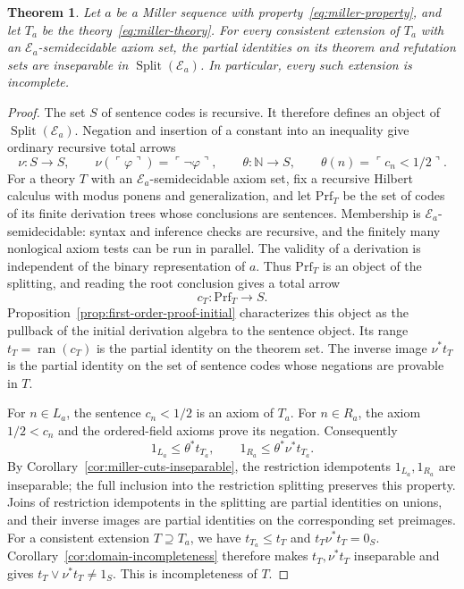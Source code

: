 \documentclass[11pt]{article}
\newtheorem{theorem}{Theorem}[section]
\newcommand{\N}{\mathbb N}
\newcommand{\ran}{\operatorname{ran}}
\begin{document}
\begin{theorem}\label{thm:miller-incompleteness}
Let $a$ be a Miller sequence with property~\eqref{eq:miller-property},
and let $T_a$ be the theory~\eqref{eq:miller-theory}.
For every consistent extension of $T_a$ with an
$\mathcal E_a$-semidecidable axiom set, the partial identities on its
theorem and refutation sets are inseparable in
$\operatorname{Split}(\mathcal E_a)$.
In particular, every such extension is incomplete.
\end{theorem}
\begin{proof}
The set $S$ of sentence codes is recursive. It therefore defines an
object of $\operatorname{Split}(\mathcal E_a)$. Negation and insertion
of a constant into an inequality give ordinary recursive total arrows
\[
 \nu:S\to S,\qquad
 \nu(\ulcorner\varphi\urcorner)=\ulcorner\neg\varphi\urcorner,
 \qquad
 \theta:\N\to S,\qquad
 \theta(n)=\ulcorner c_n<1/2\urcorner.
\]
For a theory $T$ with an $\mathcal E_a$-semidecidable axiom set,
fix a recursive Hilbert calculus with modus ponens and generalization,
and let $\mathrm{Prf}_T$ be the set of codes of its finite derivation
trees whose conclusions are sentences. Membership is
$\mathcal E_a$-semidecidable: syntax and inference checks are recursive,
and the finitely many nonlogical axiom tests can be run in parallel.
The validity of a derivation is independent of the binary representation of $a$. Thus
$\mathrm{Prf}_T$ is an object of the splitting, and reading the root
conclusion gives a total arrow
\[
 c_T:\mathrm{Prf}_T\to S.
\]
Proposition~\ref{prop:first-order-proof-initial} characterizes this object
as the pullback of the initial derivation algebra to the sentence object.
Its range $t_T=\ran(c_T)$ is the partial identity on the theorem set.
The inverse image $\nu^*t_T$ is the partial identity on the set of
sentence codes whose negations are provable in $T$.

For $n\in L_a$, the sentence $c_n<1/2$ is an axiom of $T_a$.
For $n\in R_a$, the axiom $1/2<c_n$ and the ordered-field axioms
prove its negation. Consequently
\[
 1_{L_a}\le\theta^*t_{T_a},\qquad
 1_{R_a}\le\theta^*\nu^*t_{T_a}.
\]
By Corollary~\ref{cor:miller-cuts-inseparable}, the restriction idempotents
$1_{L_a},1_{R_a}$ are inseparable; the full inclusion into the restriction
splitting preserves this property. Joins of restriction idempotents in
the splitting are partial identities on unions, and their inverse images
are partial identities on the corresponding set preimages.
For a consistent extension $T\supseteq T_a$, we have
$t_{T_a}\le t_T$ and $t_T\nu^*t_T=0_S$.
Corollary~\ref{cor:domain-incompleteness} therefore makes
$t_T,\nu^*t_T$ inseparable and gives
$t_T\vee\nu^*t_T\ne1_S$. This is incompleteness of $T$.
\end{proof}
\end{document}
